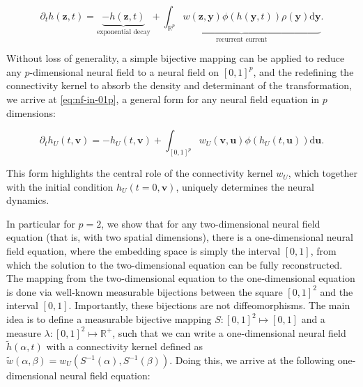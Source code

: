 \documentclass[NETN,manuscript]{stjour-new}
\def\R{\mathbb R}
\def\Rp{\R^p}
\renewcommand{\vec}[1]{\boldsymbol{#1}}
\begin{document}
\begin{equation} \label{eq:nf-in-rp}
\partial_t h(\vec z, t) = \underbrace{-h(\vec z, t)}_\text{exponential decay} + \underbrace{\int_{\mathbb{R}^p} w(\vec z, \vec y) \phi(h(\vec y, t)) \rho(\vec y) \mathrm d \vec y}_\text{recurrent current}.
\end{equation}

Without loss of generality, a simple bijective mapping can be applied to reduce any $p$-dimensional neural field to a neural field on $[0,1]^p$, and the redefining the connectivity kernel to absorb the density and determinant of the transformation, we arrive at \autoref{eq:nf-in-01p}, a general form for any neural field equation in $p$ dimensions:


\begin{equation} \label{eq:nf-in-01p}
\partial_t h_U(t, \vec v) = -h_U(t, \vec v) + \int_{[0,1]^p} w_U(\vec v, \vec u) \phi(h_U(t, \vec u)) \mathrm d \vec u.
\end{equation}

This form highlights the central role of the connectivity kernel $w_U$, which together with the initial condition $h_U(t=0, \vec v)$, uniquely determines the neural dynamics.


In particular for $p=2$, we show that for any two-dimensional neural field equation (that is, with two spatial dimensions), there is a one-dimensional neural field equation, where the embedding space is simply the interval $[0,1]$, from which the solution to the two-dimensional equation can be fully reconstructed. The mapping from the two-dimensional equation to the one-dimensional equation is done via well-known measurable bijections between the square $[0,1]^2$ and the interval $[0,1]$. Importantly, these bijections are not diffeomorphisms.
The main idea is to define a measurable bijective mapping $S : [0,1]^2 \mapsto [0,1]$ and a measure $\lambda : [0,1]^2 \mapsto \mathbb{R}^+$, such that we can write a one-dimensional neural field	$\tilde h(\alpha, t)$ with a connectivity kernel defined as $\tilde w(\alpha, \beta) = w_U(S^{-1}(\alpha), S^{-1}(\beta))$. Doing this, we arrive at the following one-dimensional neural field equation: 
\end{document}
